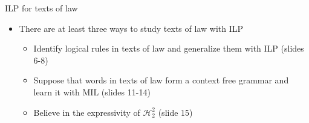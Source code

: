 \begin{frame}{ILP for texts of law}
\vfill
\begin{itemize}
    \item There are at least three ways to study texts of law with ILP
    \begin{itemize}
\vfill
        \item[\ding{43}] Identify logical rules in texts of law and generalize them with ILP (slides 6-8)
\vfill
        \item[\ding{43}] Suppose that words in texts of law form a context free grammar and learn it with MIL (slides 11-14)
\vfill
        \item[\ding{43}] Believe in the expressivity of $\mathcal{H}_2^2$ (slide 15)
    \end{itemize}
\end{itemize}
    \vfill

\end{frame}